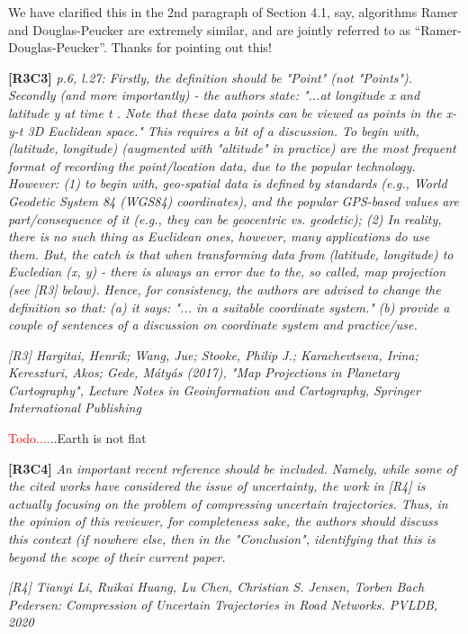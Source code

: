 \documentclass{letter}
\newcommand{\todo}[1]{\textcolor{red}{Todo...#1}}
\begin{document}
We have clarified this in the 2nd paragraph of Section 4.1, say, algorithms Ramer and Douglas-Peucker are extremely similar, and are jointly referred to as ``Ramer-Douglas-Peucker''.
Thanks for pointing out this!



\textbf{[R3C3]} \emph{p.6, l.27: Firstly, the definition should be "Point" (not "Points"). Secondly (and more importantly) - the authors state: "...at longitude x and latitude y at time t . Note that these data points can be viewed as points in the x-y-t 3D Euclidean space." This requires a bit of a discussion. To begin with, (latitude, longitude) (augmented with "altitude" in practice) are the most frequent format of recording the point/location data, due to the popular technology. However: (1) to begin with, geo-spatial data is defined by standards (e.g., World Geodetic System 84 (WGS84) coordinates), and the popular GPS-based values are part/consequence of it (e.g., they can be geocentric vs. geodetic); (2) In reality, there is no such thing as Euclidean ones, however, many applications do use them. But, the catch is that when transforming data from (latitude, longitude) to Eucledian (x, y) - there is always an error due to the, so called, map projection (see [R3] below).}
%	
\emph{Hence, for consistency, the authors are advised to change the definition so that:}
%	
\emph{(a) it says: "... in a suitable coordinate system."}
%	
\emph{(b) provide a couple of sentences of a discussion on coordinate system and practice/use.}

\emph{[R3] Hargitai, Henrik; Wang, Jue; Stooke, Philip J.; Karachevtseva, Irina; Kereszturi, Akos; Gede, Mátyás (2017), "Map Projections in Planetary Cartography", Lecture Notes in Geoinformation and Cartography, Springer International Publishing}



\todo...Earth is not flat



\textbf{[R3C4]} \emph{An important recent reference should be included. Namely, while some of the cited works have considered the issue of uncertainty, the work in [R4] is actually focusing on the problem of compressing uncertain trajectories. Thus, in the opinion of this reviewer, for completeness sake, the authors should discuss this context (if nowhere else, then in the "Conclusion", identifying that this is beyond the scope of their current paper. }

\emph{[R4] Tianyi Li, Ruikai Huang, Lu Chen, Christian S. Jensen, Torben Bach Pedersen:
	Compression of Uncertain Trajectories in Road Networks. PVLDB, 2020}
\end{document}
